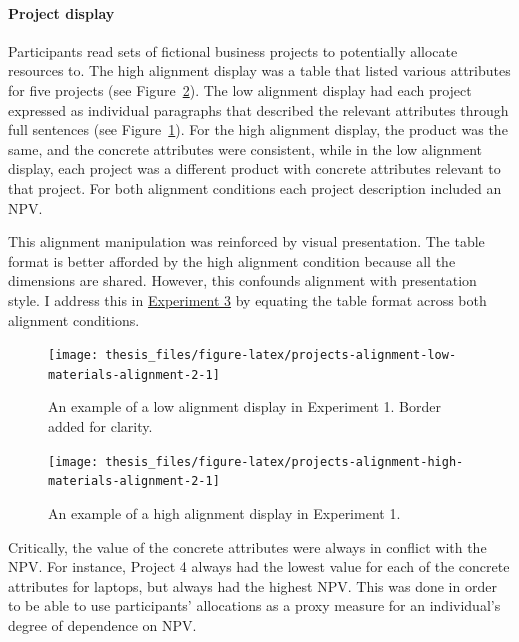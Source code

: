 \documentclass[a4paper, nobind, dvipsnames]{templates/ociamthesis}
\theoremstyle{definition}
\theoremstyle{definition}
\theoremstyle{definition}
\theoremstyle{definition}
\theoremstyle{remark}
\begin{document}
\hypertarget{projects-materials-alignment-2}{%
\paragraph{Project display}\label{projects-materials-alignment-2}}

Participants read sets of fictional business projects to potentially allocate
resources to. The high alignment display was a table that listed various
attributes for five projects (see
Figure~\ref{fig:projects-alignment-high-materials-alignment-2}). The low
alignment display had each project expressed as individual paragraphs that
described the relevant attributes through full sentences (see
Figure~\ref{fig:projects-alignment-low-materials-alignment-2}). For the high
alignment display, the product was the same, and the concrete attributes were
consistent, while in the low alignment display, each project was a different
product with concrete attributes relevant to that project. For both alignment
conditions each project description included an NPV.

This alignment manipulation was reinforced by visual presentation. The table
format is better afforded by the high alignment condition because all the
dimensions are shared. However, this confounds alignment with presentation
style. I address this in \protect\hyperlink{alignment-8}{Experiment 3} by equating the table
format across both alignment conditions.



\begin{figure}
\texttt{[image: thesis\_files/figure-latex/projects-alignment-low-materials-alignment-2-1]} \caption{An example of a low alignment display in Experiment 1. Border added for clarity.}\label{fig:projects-alignment-low-materials-alignment-2}
\end{figure}



\begin{figure}
\texttt{[image: thesis\_files/figure-latex/projects-alignment-high-materials-alignment-2-1]} \caption{An example of a high alignment display in Experiment 1.}\label{fig:projects-alignment-high-materials-alignment-2}
\end{figure}

Critically, the value of the concrete attributes were always in conflict with
the NPV. For instance, Project 4 always had the lowest value for each of the
concrete attributes for laptops, but always had the highest NPV. This was done
in order to be able to use participants' allocations as a proxy measure for an
individual's degree of dependence on NPV.
\end{document}
